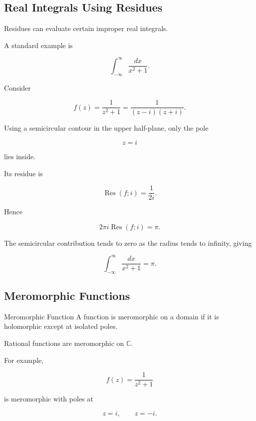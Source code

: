 \subsection{Real Integrals Using Residues}
\label{subsec:real-integrals-residues}

Residues can evaluate certain improper real integrals.

A standard example is

\[
\int_{-\infty}^{\infty}
\frac{dx}{x^2+1}.
\]

Consider

\[
f(z)
=
\frac{1}{z^2+1}
=
\frac{1}{(z-i)(z+i)}.
\]

Using a semicircular contour in the upper half-plane, only the pole

\[
z=i
\]

lies inside.

Its residue is

\[
\operatorname{Res}(f;i)
=
\frac{1}{2i}.
\]

Hence

\[
2\pi i
\operatorname{Res}(f;i)
=
\pi.
\]

The semicircular contribution tends to zero as the radius tends to
infinity, giving

\[
\boxed{
\int_{-\infty}^{\infty}
\frac{dx}{x^2+1}
=
\pi.
}
\]

\subsection{Meromorphic Functions}
\label{subsec:meromorphic-functions}

\begin{definitionbox}{Meromorphic Function}
A function is meromorphic on a domain if it is holomorphic except at
isolated poles.
\end{definitionbox}

Rational functions are meromorphic on \(\mathbb{C}\).

For example,

\[
\boxed{
f(z)=\frac{1}{z^2+1}
}
\]

is meromorphic with poles at

\[
z=i,
\qquad
z=-i.
\]

